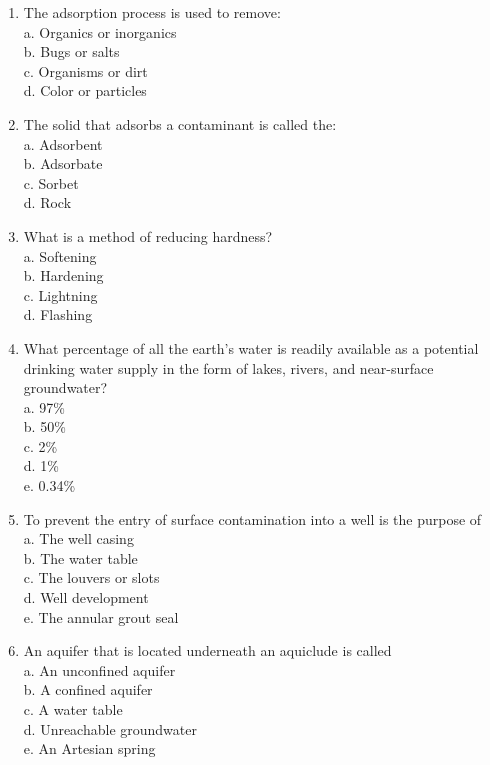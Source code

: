 \documentclass[10pt]{article}
\begin{document}
\begin{enumerate}
\item The adsorption process is used to remove:\\
a.  Organics or inorganics\\
b.  Bugs or salts\\
c.  Organisms or dirt\\
d.  Color or particles\\

\item The solid that adsorbs a contaminant is called the:\\
a.  Adsorbent\\
b.  Adsorbate\\
c.  Sorbet\\
d.  Rock\\

\item What is a method of reducing hardness?\\
a.  Softening\\
b.  Hardening\\
c.  Lightning\\
d.  Flashing\\


\item What percentage of all the earth's water is readily available as a potential drinking water supply in the form of lakes, rivers, and near-surface groundwater?\\
a.  97\%\\
b.  50\%\\
c.  2\%\\
d.  1\%\\
e.  0.34\%\\

\item To  prevent the entry of surface contamination into a well is the purpose of\\
a.  The well casing\\
b.  The water table\\
c.  The louvers or slots\\
d.  Well development\\
e.  The  annular grout seal\\

\item An aquifer that is located underneath an aquiclude is called\\
a.  An unconfined aquifer\\
b.  A confined aquifer\\
c.  A water table\\
d.  Unreachable groundwater\\
e.  An Artesian spring\\


\end{enumerate}
\end{document}
